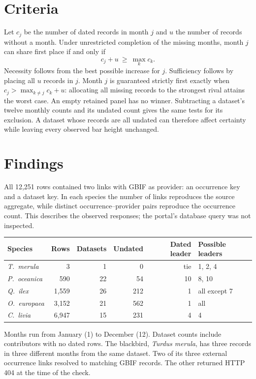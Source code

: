 \documentclass[11pt]{article}
\begin{document}
\section{Criteria}
Let $c_j$ be the number of dated records in month $j$ and $u$ the number of records without a month. Under unrestricted completion of the missing months, month $j$ can share first place if and only if
\[
 c_j+u\ \geq\ \max_k c_k .
\]
Necessity follows from the best possible increase for $j$. Sufficiency follows by placing all $u$ records in $j$. Month $j$ is guaranteed strictly first exactly when $c_j>\max_{k\ne j} c_k+u$: allocating all missing records to the strongest rival attains the worst case. An empty retained panel has no winner. Subtracting a dataset's twelve monthly counts and its undated count gives the same tests for its exclusion. A dataset whose records are all undated can therefore affect certainty while leaving every observed bar height unchanged.

\section{Findings}
All 12,251 rows contained two links with GBIF as provider: an occurrence key and a dataset key. In each species the number of links reproduces the source aggregate, while distinct occurrence--provider pairs reproduce the occurrence count. This describes the observed responses; the portal's database query was not inspected.
\begin{center}\small
\begin{tabular}{lrrrrl}
\toprule
Species & Rows & Datasets & Undated & Dated leader & Possible leaders\\
\midrule
\emph{T.\ merula} & 3 & 1 & 0 & tie & 1, 2, 4\\
\emph{P.\ oceanica} & 590 & 22 & 54 & 10 & 8, 10\\
\emph{Q.\ ilex} & 1,559 & 26 & 212 & 1 & all except 7\\
\emph{O.\ europaea} & 3,152 & 21 & 562 & 1 & all\\
\emph{C.\ livia} & 6,947 & 15 & 231 & 4 & 4\\
\bottomrule
\end{tabular}
\end{center}
Months run from January (1) to December (12). Dataset counts include contributors with no dated rows. The blackbird, \emph{Turdus merula}, has three records in three different months from the same dataset. Two of its three external occurrence links resolved to matching GBIF records. The other returned HTTP 404 at the time of the check.
\end{document}
